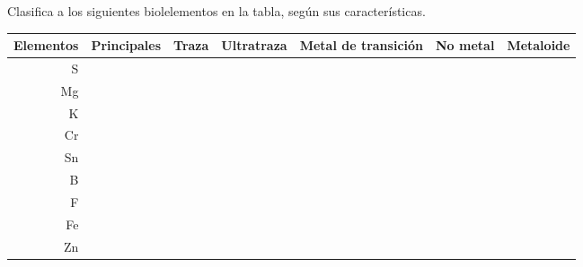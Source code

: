 Clasifica a los siguientes biolelementos en la tabla, según sus características.

\begin{table}[H]
    \centering
    \begin{tabular}{r|l|l|l|l|l|l|}
        Elementos & Principales & Traza & Ultratraza & Metal de transición & No metal & Metaloide \\ \hline
        S         &             &       &            &                     &          &           \\ \hline
        Mg        &             &       &            &                     &          &           \\ \hline
        K         &             &       &            &                     &          &           \\ \hline
        Cr        &             &       &            &                     &          &           \\ \hline
        Sn        &             &       &            &                     &          &           \\ \hline
        B         &             &       &            &                     &          &           \\ \hline
        F         &             &       &            &                     &          &           \\ \hline
        Fe        &             &       &            &                     &          &           \\ \hline
        Zn        &             &       &            &                     &          &           \\ \hline
    \end{tabular}
\end{table}